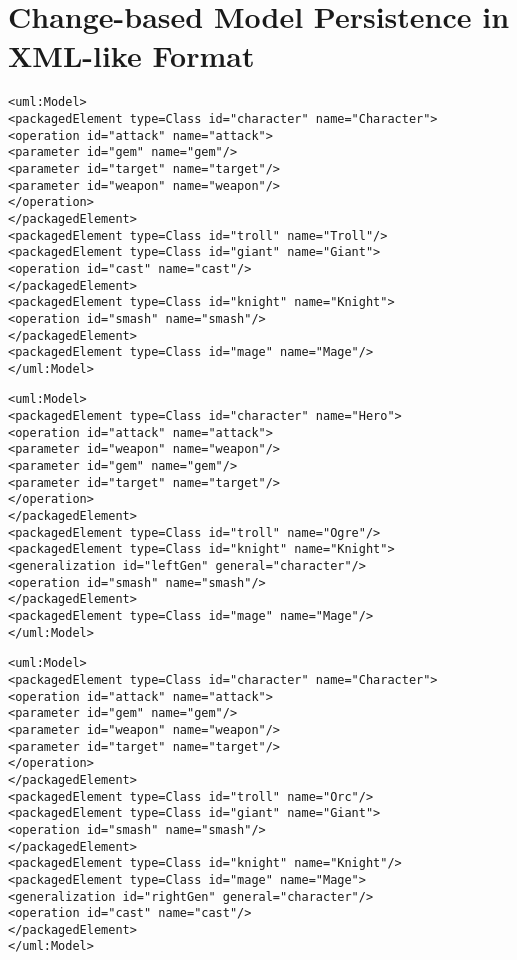 \chapter{Change-based Model Persistence in XML-like Format}
\label{sec:examples_of_cbp}

\vspace{-20pt}
\begin{lstlisting}[style=xmi,caption={Simplified XMI file of the original version in Figure \ref{fig:class_diagram_origin}.},label=lst:xmimodel_origin]
<uml:Model>
<packagedElement type=Class id="character" name="Character">
<operation id="attack" name="attack">
<parameter id="gem" name="gem"/>
<parameter id="target" name="target"/>
<parameter id="weapon" name="weapon"/>
</operation>
</packagedElement>
<packagedElement type=Class id="troll" name="Troll"/>
<packagedElement type=Class id="giant" name="Giant">
<operation id="cast" name="cast"/>
</packagedElement>
<packagedElement type=Class id="knight" name="Knight">
<operation id="smash" name="smash"/>
</packagedElement>
<packagedElement type=Class id="mage" name="Mage"/>
</uml:Model>
\end{lstlisting}

\vspace{-20pt}
\begin{lstlisting}[style=xmi,caption={Simplified XMI file of the left version in Figure \ref{fig:class_diagram_left}.},label=lst:xmimodel_left]
<uml:Model>
<packagedElement type=Class id="character" name="Hero">
<operation id="attack" name="attack">
<parameter id="weapon" name="weapon"/>
<parameter id="gem" name="gem"/>
<parameter id="target" name="target"/>
</operation>  
</packagedElement>
<packagedElement type=Class id="troll" name="Ogre"/>
<packagedElement type=Class id="knight" name="Knight">
<generalization id="leftGen" general="character"/>
<operation id="smash" name="smash"/>
</packagedElement>
<packagedElement type=Class id="mage" name="Mage"/>
</uml:Model>
\end{lstlisting}

\vspace{-20pt}
\begin{lstlisting}[style=xmi,caption={Simplified XMI file of the right version of Figure \ref{fig:class_diagram_right}.},label=lst:xmimodel_right]
<uml:Model>
<packagedElement type=Class id="character" name="Character">
<operation id="attack" name="attack">
<parameter id="gem" name="gem"/>
<parameter id="weapon" name="weapon"/>
<parameter id="target" name="target"/>
</operation>
</packagedElement>
<packagedElement type=Class id="troll" name="Orc"/>
<packagedElement type=Class id="giant" name="Giant">
<operation id="smash" name="smash"/>
</packagedElement>
<packagedElement type=Class id="knight" name="Knight"/>
<packagedElement type=Class id="mage" name="Mage">
<generalization id="rightGen" general="character"/>
<operation id="cast" name="cast"/>
</packagedElement>
</uml:Model>
\end{lstlisting}





